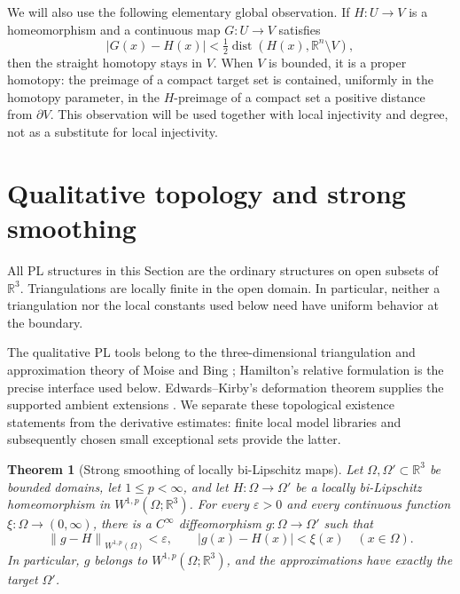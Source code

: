 \documentclass[11pt]{article}
\numberwithin{equation}{section}
\newtheorem{theorem}{Theorem}[section]
\theoremstyle{definition}
\theoremstyle{remark}
\newcommand{\R}{\mathbb R}
\newcommand{\eps}{\varepsilon}
\newcommand{\norm}[1]{\left\lVert #1\right\rVert}
\DeclareMathOperator{\dist}{dist}
\begin{document}
We will also use the following elementary global observation. If $H:U\to V$ is a homeomorphism and a continuous map $G:U\to V$ satisfies
\[
 |G(x)-H(x)|<\tfrac12\dist(H(x),\R^n\setminus V),
\]
then the straight homotopy stays in $V$. When $V$ is bounded, it is a proper homotopy: the preimage of a compact target set is contained, uniformly in the homotopy parameter, in the $H$-preimage of a compact set a positive distance from $\partial V$. This observation will be used together with local injectivity and degree, not as a substitute for local injectivity.

\tableofcontents
\section{Qualitative topology and strong smoothing}
\label{sec:smoothing}

All PL structures in this Section are the ordinary structures on open
subsets of $\R^3$.  Triangulations are locally finite in the open domain.
In particular, neither a triangulation nor the local constants used below
need have uniform behavior at the boundary.

The qualitative PL tools belong to the three-dimensional triangulation
and approximation theory of Moise and Bing
\cite{Moise1952Approximation,Moise1952Triangulation,Bing1959}; Hamilton's
relative formulation \cite{Hamilton1976} is the precise interface used
below. Edwards--Kirby's deformation theorem supplies the supported
ambient extensions \cite{EdwardsKirby1971}. We separate these
topological existence statements from the derivative estimates:
finite local model libraries and subsequently chosen small exceptional
sets provide the latter.

\begin{theorem}[Strong smoothing of locally bi-Lipschitz maps]
\label{sm:smoothing}
Let $\Omega,\Omega'\subset\R^3$ be bounded domains, let
$1\le p<\infty$, and let $H:\Omega\to\Omega'$ be a locally
bi-Lipschitz homeomorphism in $W^{1,p}(\Omega;\R^3)$.  For every
$\eps>0$ and every continuous function $\xi:\Omega\to(0,\infty)$,
there is a $C^\infty$ diffeomorphism $g:\Omega\to\Omega'$ such that
\begin{equation}
 \label{sm:smoothing-conclusion}
 \norm{g-H}_{W^{1,p}(\Omega)}<\eps,
 \qquad |g(x)-H(x)|<\xi(x)\quad(x\in\Omega).
\end{equation}
In particular, $g$ belongs to $W^{1,p}(\Omega;\R^3)$, and the
approximations have exactly the target $\Omega'$.
\end{theorem}
\end{document}
